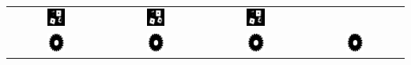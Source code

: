 \begin{table}
\begin{tabular}{c||c|c|c}
\includegraphics[width=0.2\textwidth]{img/res/e1a/alg1tipo6-block.jpg} &
\includegraphics[width=0.2\textwidth]{img/res/e1a/alg1tipo6d0.75-block.jpg} &
\includegraphics[width=0.2\textwidth]{img/res/e1a/alg1tipo6d1.25-block.jpg} \\
\includegraphics[width=0.2\textwidth]{img/res/e1a/alg1tipo1-02.jpg} &
\includegraphics[width=0.2\textwidth]{img/res/e1a/alg1tipo6-02.jpg} &
\includegraphics[width=0.2\textwidth]{img/res/e1a/alg1tipo6d0.75-02.jpg} &
\includegraphics[width=0.2\textwidth]{img/res/e1a/alg1tipo6d1.25-02.jpg} \\

\end{tabular}
\end{table}

